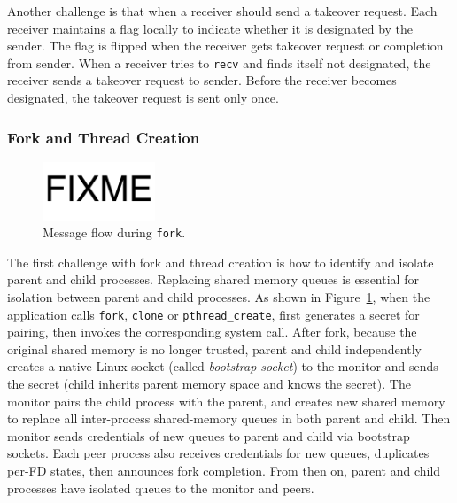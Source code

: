 Another challenge is that when a receiver should send a takeover request. Each receiver maintains a flag locally to indicate whether it is designated by the sender. The flag is flipped when the receiver gets takeover request or completion from sender. When a receiver tries to \texttt{recv} and finds itself not designated, the receiver sends a takeover request to sender. Before the receiver becomes designated, the takeover request is sent only once.


\subsubsection{Fork and Thread Creation}
\label{subsubsec:fork_fork}


\begin{figure}[t]
	\centering
	\includegraphics[width=0.3\textwidth]{images/fixme}
	\caption{Message flow during \texttt{fork}.}
	\label{fig:fork-fork}
\end{figure}


The first challenge with fork and thread creation is how to identify and isolate parent and child processes. Replacing shared memory queues is essential for isolation between parent and child processes. As shown in Figure~\ref{fig:fork-fork}, when the application calls \texttt{fork}, \texttt{clone} or \texttt{pthread\_create}, \libipc{} first generates a secret for pairing, then invokes the corresponding system call. After fork, because the original shared memory is no longer trusted, parent and child independently creates a native Linux socket (called \textit{bootstrap socket}) to the monitor and sends the secret (child inherits parent memory space and knows the secret). The monitor pairs the child process with the parent, and creates new shared memory to replace all inter-process shared-memory queues in both parent and child. Then monitor sends credentials of new queues to parent and child via bootstrap sockets. Each peer process also receives credentials for new queues, duplicates per-FD states, then announces fork completion. From then on, parent and child processes have isolated queues to the monitor and peers.

